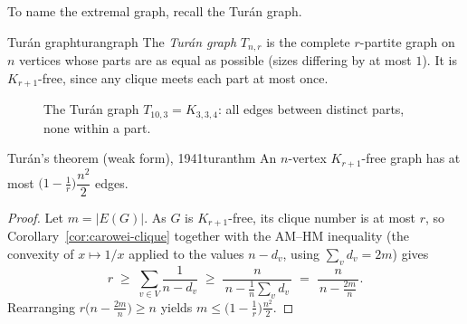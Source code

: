 To name the extremal graph, recall the Tur\'an graph.

\begin{definition}{Tur\'an graph}{turangraph}
The \emph{Tur\'an graph} $T_{n,r}$ is the complete $r$-partite graph on $n$
vertices whose parts are as equal as possible (sizes differing by at most
$1$). It is $K_{r+1}$-free, since any clique meets each part at most once.
\end{definition}

\begin{figure}[h]
\centering
{}
\caption{The Tur\'an graph $T_{10,3}=K_{3,3,4}$: all edges between distinct
parts, none within a part.}
\label{fig:turangraph}
\end{figure}

\begin{theorem}{Tur\'an's theorem (weak form), 1941}{turanthm}
An $n$-vertex $K_{r+1}$-free graph has at most
$\bigl(1-\tfrac1r\bigr)\dfrac{n^2}{2}$ edges.
\end{theorem}

\begin{proof}
Let $m=|E(G)|$. As $G$ is $K_{r+1}$-free, its clique number is at most $r$, so
Corollary~\ref{cor:carowei-clique} together with the AM--HM inequality (the
convexity of $x\mapsto 1/x$ applied to the values $n-d_v$, using
$\sum_v d_v=2m$) gives
\[
  r \;\ge\; \sum_{v\in V}\frac{1}{n-d_v}
    \;\ge\; \frac{n}{\,n-\frac1n\sum_v d_v\,}
    \;=\; \frac{n}{\,n-\frac{2m}{n}\,}.
\]
Rearranging $r\bigl(n-\tfrac{2m}{n}\bigr)\ge n$ yields
$m\le\bigl(1-\tfrac1r\bigr)\tfrac{n^2}{2}$.
\end{proof}

